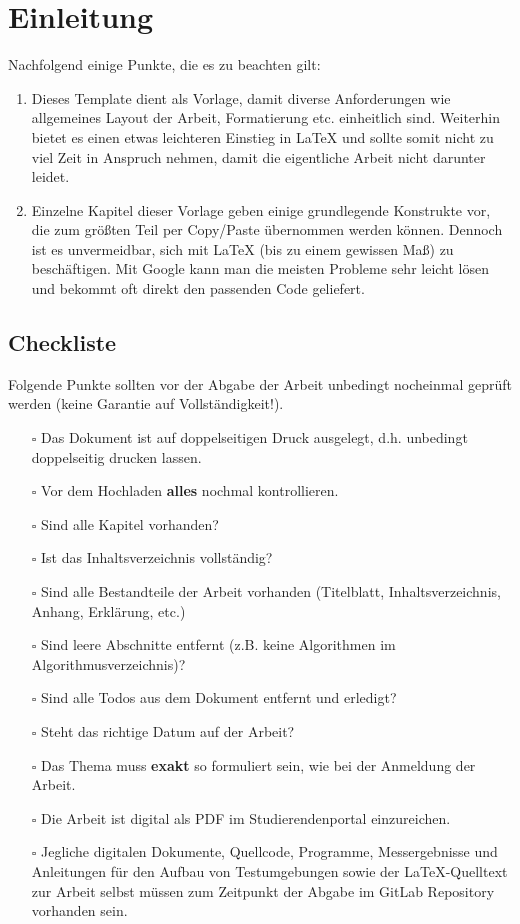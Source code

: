 \chapter{Einleitung}

Nachfolgend einige Punkte, die es zu beachten gilt:
\begin{enumerate}
 \item Dieses Template dient als Vorlage, damit diverse Anforderungen wie allgemeines Layout der Arbeit,
       Formatierung etc. einheitlich sind. Weiterhin bietet es einen etwas leichteren Einstieg in LaTeX
       und sollte somit nicht zu viel Zeit in Anspruch nehmen, damit die eigentliche Arbeit nicht darunter leidet.
 \item Einzelne Kapitel dieser Vorlage geben einige grundlegende Konstrukte vor, die zum größten Teil per
       Copy/Paste übernommen werden können. Dennoch ist es unvermeidbar, sich mit LaTeX (bis zu einem
       gewissen Maß) zu beschäftigen. Mit Google kann man die meisten Probleme sehr leicht lösen und
       bekommt oft direkt den passenden Code geliefert.
\end{enumerate}

\clearpage

\section{Checkliste}

Folgende Punkte sollten vor der Abgabe der Arbeit unbedingt nocheinmal geprüft werden (keine Garantie auf Vollständigkeit!).

\begin{enumerate}
 \item[$\square$] Das Dokument ist auf doppelseitigen Druck ausgelegt, d.h. unbedingt doppelseitig drucken lassen.
 \item[$\square$] Vor dem Hochladen \textbf{alles} nochmal kontrollieren.
 \item[$\square$] Sind alle Kapitel vorhanden?
 \item[$\square$] Ist das Inhaltsverzeichnis vollständig?
 \item[$\square$] Sind alle Bestandteile der Arbeit vorhanden (Titelblatt, Inhaltsverzeichnis, Anhang, Erklärung, etc.)
 \item[$\square$] Sind leere Abschnitte entfernt (z.B. keine Algorithmen im Algorithmusverzeichnis)?
 \item[$\square$] Sind alle Todos aus dem Dokument entfernt und erledigt? 
 \item[$\square$] Steht das richtige Datum auf der Arbeit?
 \item[$\square$] Das Thema muss \textbf{exakt} so formuliert sein, wie bei der Anmeldung der Arbeit.
 \item[$\square$] Die Arbeit ist digital als PDF im Studierendenportal einzureichen.
 \item[$\square$] Jegliche digitalen Dokumente, Quellcode, Programme, Messergebnisse und Anleitungen für den Aufbau von Testumgebungen sowie der LaTeX-Quelltext zur Arbeit selbst müssen zum Zeitpunkt der Abgabe im GitLab Repository vorhanden sein.
\end{enumerate}